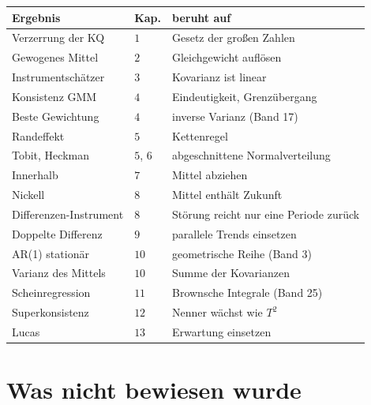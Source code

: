 \begin{merksatz}
\begin{center}
{\small
\renewcommand{\arraystretch}{1.4}
\begin{tabular}{@{}P{3.6cm}P{1.0cm}P{3.4cm}@{}}
\toprule
\textbf{Ergebnis} & \textbf{Kap.} & \textbf{beruht auf}\\
\midrule
Verzerrung der KQ & $1$ & Gesetz der großen Zahlen\\
Gewogenes Mittel & $2$ & Gleichgewicht auflösen\\
Instrumentschätzer & $3$ & Kovarianz ist linear\\
Konsistenz GMM & $4$ & Eindeutigkeit, Grenzübergang\\
Beste Gewichtung & $4$ & inverse Varianz (Band 17)\\
Randeffekt & $5$ & Kettenregel\\
Tobit, Heckman & $5$, $6$ & abgeschnittene Normalverteilung\\
Innerhalb & $7$ & Mittel abziehen\\
Nickell & $8$ & Mittel enthält Zukunft\\
Differenzen-Instrument & $8$ & Störung reicht nur eine Periode zurück\\
Doppelte Differenz & $9$ & parallele Trends einsetzen\\
AR(1) stationär & $10$ & geometrische Reihe (Band 3)\\
Varianz des Mittels & $10$ & Summe der Kovarianzen\\
Scheinregression & $11$ & Brownsche Integrale (Band 25)\\
Superkonsistenz & $12$ & Nenner wächst wie $T^{2}$\\
Lucas & $13$ & Erwartung einsetzen\\
\bottomrule
\end{tabular}}
\end{center}
\end{merksatz}

\section{Was nicht bewiesen wurde}

